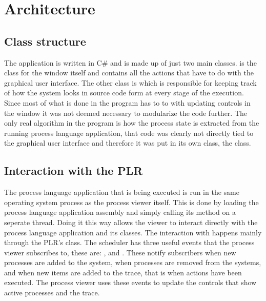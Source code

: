 \section{Architecture}
  
  \subsection{Class structure}
  The application is written in C\# and is made up of just two main classes. 
   is the class for the window itself and contains all
  the actions that have to do with the graphical user interface. The other
  class is  which is responsible for keeping
  track of how the system looks in source code form at every stage of the
  execution. Since most of what is done in the program has to to with updating
  controls in the window it was not deemed necessary to modularize the code
  further. The only real algorithm in the program is how the process state is
  extracted from the running process language application, that code was 
  clearly not directly tied to the graphical user interface and therefore it
  was put in its own class, the  class.
  
  \subsection{Interaction with the PLR}
  
  The process language application that is being executed is run in the same 
  operating system process as the process viewer itself. This is done by 
  loading the process language application assembly and simply calling its 
   method on a seperate thread. Doing it this way allows the 
  viewer to interact directly with the process language application and its 
  classes. The interaction with happens mainly through the PLR's 
   class. The scheduler has three useful events that the 
  process viewer subscribes to, these are: , 
   and . These notify subscribers 
  when new processes are added to the system, when processes are removed from 
  the systems, and when new items are added to the trace, that is when actions 
  have been executed. The process viewer uses these events to update the 
  controls that show active processes and the trace. 
  
